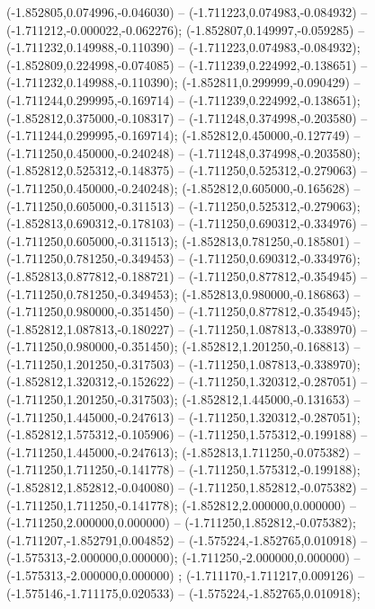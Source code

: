  (-1.852805,0.074996,-0.046030) -- (-1.711223,0.074983,-0.084932) -- (-1.711212,-0.000022,-0.062276);
 (-1.852807,0.149997,-0.059285) -- (-1.711232,0.149988,-0.110390) -- (-1.711223,0.074983,-0.084932);
 (-1.852809,0.224998,-0.074085) -- (-1.711239,0.224992,-0.138651) -- (-1.711232,0.149988,-0.110390);
 (-1.852811,0.299999,-0.090429) -- (-1.711244,0.299995,-0.169714) -- (-1.711239,0.224992,-0.138651);
 (-1.852812,0.375000,-0.108317) -- (-1.711248,0.374998,-0.203580) -- (-1.711244,0.299995,-0.169714);
 (-1.852812,0.450000,-0.127749) -- (-1.711250,0.450000,-0.240248) -- (-1.711248,0.374998,-0.203580);
 (-1.852812,0.525312,-0.148375) -- (-1.711250,0.525312,-0.279063) -- (-1.711250,0.450000,-0.240248);
 (-1.852812,0.605000,-0.165628) -- (-1.711250,0.605000,-0.311513) -- (-1.711250,0.525312,-0.279063);
 (-1.852813,0.690312,-0.178103) -- (-1.711250,0.690312,-0.334976) -- (-1.711250,0.605000,-0.311513);
 (-1.852813,0.781250,-0.185801) -- (-1.711250,0.781250,-0.349453) -- (-1.711250,0.690312,-0.334976);
 (-1.852813,0.877812,-0.188721) -- (-1.711250,0.877812,-0.354945) -- (-1.711250,0.781250,-0.349453);
 (-1.852813,0.980000,-0.186863) -- (-1.711250,0.980000,-0.351450) -- (-1.711250,0.877812,-0.354945);
 (-1.852812,1.087813,-0.180227) -- (-1.711250,1.087813,-0.338970) -- (-1.711250,0.980000,-0.351450);
 (-1.852812,1.201250,-0.168813) -- (-1.711250,1.201250,-0.317503) -- (-1.711250,1.087813,-0.338970);
 (-1.852812,1.320312,-0.152622) -- (-1.711250,1.320312,-0.287051) -- (-1.711250,1.201250,-0.317503);
 (-1.852812,1.445000,-0.131653) -- (-1.711250,1.445000,-0.247613) -- (-1.711250,1.320312,-0.287051);
 (-1.852812,1.575312,-0.105906) -- (-1.711250,1.575312,-0.199188) -- (-1.711250,1.445000,-0.247613);
 (-1.852813,1.711250,-0.075382) -- (-1.711250,1.711250,-0.141778) -- (-1.711250,1.575312,-0.199188);
 (-1.852812,1.852812,-0.040080) -- (-1.711250,1.852812,-0.075382) -- (-1.711250,1.711250,-0.141778);
 (-1.852812,2.000000,0.000000) -- (-1.711250,2.000000,0.000000) -- (-1.711250,1.852812,-0.075382);
 (-1.711207,-1.852791,0.004852) -- (-1.575224,-1.852765,0.010918) -- (-1.575313,-2.000000,0.000000);
 (-1.711250,-2.000000,0.000000) -- (-1.575313,-2.000000,0.000000) ;
 (-1.711170,-1.711217,0.009126) -- (-1.575146,-1.711175,0.020533) -- (-1.575224,-1.852765,0.010918);
